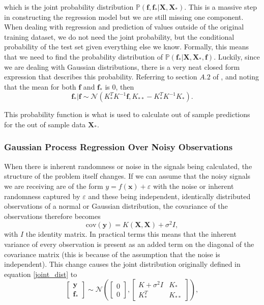 which is the joint probability distribution $\mathbb{P}(\boldsymbol{f}, \boldsymbol{f}_* | \boldsymbol{X}, \boldsymbol{X}_*)$. This is a massive step in constructing the regression model but we are still missing one component. When dealing with regression and prediction of values outside of the original training dataset, we do not need the joint probability, but the conditional probability of the test set given everything else we know. Formally, this means that we need to find the probability distribution of $\mathbb{P}(\boldsymbol{f}_* | \boldsymbol{X}, \boldsymbol{X}_*, \boldsymbol{f})$. Luckily, since we are dealing with Gaussian distributions, there is a very neat closed form expression that describes this probability. Referring to section $A.2$ of \cite{rasmussen2006gaussian}, and noting that the mean for both $\boldsymbol{f}$ and $\boldsymbol{f}_*$ is 0, then 
\[ \boldsymbol{f}_* | \boldsymbol{f} \sim \mathcal{N}(K_*^T K^{-1} \boldsymbol{f}, K_{**} - K_*^T K^{-1} K_*). \]

This probability function is what is used to calculate out of sample predictions for the out of sample data $\boldsymbol{X}_*$. 

\subsubsection{Gaussian Process Regression Over Noisy Observations}

When there is inherent randomness or noise in the signals being calculated, the structure of the problem itself changes. If we can assume that the noisy signals we are receiving are of the form $y = f(\boldsymbol{x}) + \varepsilon$ with the noise or inherent randomness captured by $\varepsilon$ and these being independent, identically distributed observations of a normal or Gaussian distribution, the covariance of the observations therefore becomes 
\[ \text{cov}(\boldsymbol{y}) = K(\boldsymbol{X}, \boldsymbol{X}) + \sigma^2 I, \]
with $I$ the identity matrix. In practical terms this means that the inherent variance of every observation is present as an added term on the diagonal of the covariance matrix (this is because of the assumption that the noise is independent). This change causes the joint distribution originally defined in equation \ref{joint_dist} to
\[ 
\begin{bmatrix}
	\boldsymbol{y} \\
	\boldsymbol{f}_*
\end{bmatrix} \sim \mathcal{N}\left( \begin{bmatrix}
	0 \\
	0
\end{bmatrix} , \begin{bmatrix}
	K + \sigma^2 I & K_* \\
	K_*^T & K_{**}
\end{bmatrix} \right), 
\]


